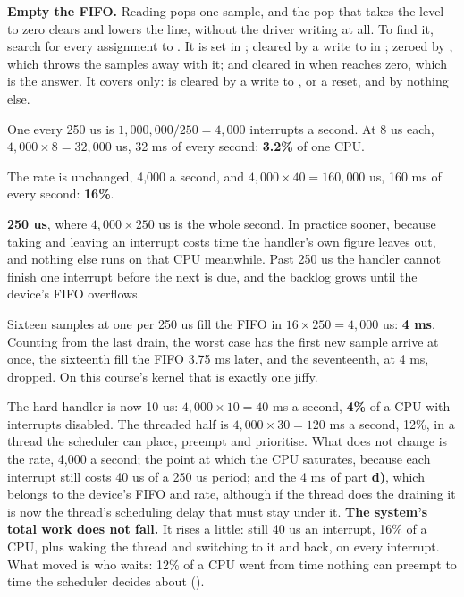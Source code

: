  \textbf{Empty the FIFO.} Reading  pops one sample, and the pop that
takes the level to zero clears  and lowers the line, without the driver writing
 at all. To find it, search  for every assignment to
. It is set in ; cleared by a write to
 in ; zeroed by , which throws the samples
away with it; and cleared in  when  reaches zero, which is
the answer. It covers  only:  is cleared by a write to
, or a reset, and by nothing else.


 One every 250 us is $1{,}000{,}000 / 250 = 4{,}000$ interrupts a second. At 8 us each,
$4{,}000 \times 8 = 32{,}000$ us, 32 ms of every second: \textbf{3.2\%} of one CPU.

 The rate is unchanged, 4,000 a second, and $4{,}000 \times 40 = 160{,}000$ us, 160 ms of
every second: \textbf{16\%}.

 \textbf{250 us}, where $4{,}000 \times 250$ us is the whole second. In practice sooner,
because taking and leaving an interrupt costs time the handler's own figure leaves out, and nothing
else runs on that CPU meanwhile. Past 250 us the handler cannot finish one interrupt before the next
is due, and the backlog grows until the device's FIFO overflows.

 Sixteen samples at one per 250 us fill the FIFO in $16 \times 250 = 4{,}000$ us:
\textbf{4 ms}. Counting from the last drain, the worst case has the first new sample arrive at once,
the sixteenth fill the FIFO 3.75 ms later, and the seventeenth, at 4 ms, dropped. On this course's
kernel that is exactly one jiffy.

 The hard handler is now 10 us: $4{,}000 \times 10 = 40$ ms a second, \textbf{4\%} of a
CPU with interrupts disabled. The threaded half is $4{,}000 \times 30 = 120$ ms a second, 12\%, in a
thread the scheduler can place, preempt and prioritise. What does not change is the rate, 4,000 a
second; the point at which the CPU saturates, because each interrupt still costs 40 us of a 250 us
period; and the 4 ms of part \textbf{d)}, which belongs to the device's FIFO and rate, although if
the thread does the draining it is now the thread's scheduling delay that must stay under it.
\textbf{The system's total work does not fall.} It rises a little: still 40 us an interrupt, 16\% of
a CPU, plus waking the thread and switching to it and back, on every interrupt. What moved is who
waits: 12\% of a CPU went from time nothing can preempt to time the scheduler decides about
().

